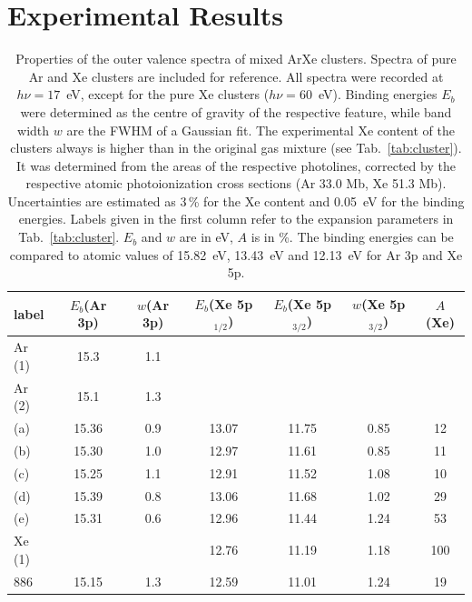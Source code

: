 \section{Experimental Results}


\begin{table}
\caption{Properties of the outer valence spectra of mixed ArXe clusters. Spectra of pure Ar and Xe clusters are included for reference. All spectra were recorded at $h\nu = 17$~eV, except for the pure Xe clusters ($h\nu = 60$~eV). Binding energies $E_b$ were determined as the centre of gravity of the respective feature, while band width $w$ are the FWHM of a Gaussian fit. The experimental Xe content of the clusters always is higher than in the original gas mixture (see Tab.\ \protect\ref{tab:cluster}). It was determined from the areas of the respective photolines, corrected by the respective atomic photoionization cross sections (Ar 33.0 Mb, Xe 51.3 Mb)\cite{samson2002}. Uncertainties are estimated as 3\,\% for the Xe content and 0.05~eV for the binding energies. Labels given in the first column refer to the expansion parameters in Tab.\ \protect\ref{tab:cluster}. $E_b$ and $w$ are in eV, $A$ is in \%. The binding energies can be compared to atomic values of 15.82~eV, 13.43~eV and 12.13~eV for Ar 3p and Xe 5p.
\label{tab:valence} }
\begin{tabular}{ l c c c c c c}
%
\toprule
  label & $E_b$(Ar 3p) & $w$(Ar 3p) & $E_b$(Xe 5p$_{1/2}$) &  $E_b$(Xe 5p$_{3/2}$) & $w$(Xe 5p$_{3/2}$)  &  $A$(Xe) \\
%
\midrule
 Ar (1) &  15.3  &  1.1 & & & &  \\
 Ar (2) &  15.1  &  1.3 & & & &  \\
%
 (a) & 15.36 & 0.9 & 13.07 & 11.75 & 0.85 & 12\\
 (b) & 15.30 & 1.0 & 12.97 & 11.61 & 0.85 & 11\\
 (c) & 15.25 & 1.1 & 12.91 & 11.52 & 1.08 & 10\\
 (d) & 15.39 & 0.8 & 13.06 & 11.68 & 1.02 & 29\\
 (e) & 15.31 & 0.6 & 12.96 & 11.44 & 1.24 & 53\\
Xe (1) & & & 12.76 & 11.19 & 1.18 & 100\\
%
\midrule
%
 886 & 15.15 & 1.3 & 12.59 & 11.01 & 1.24 & 19\\
\bottomrule
\end{tabular}
\end{table}


